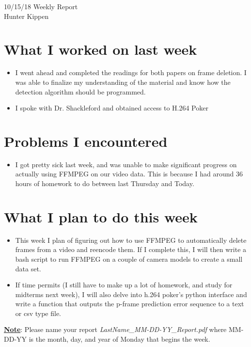 \documentclass[12pt]{article}%
\def\bi{\begin{itemize}     %
\vspace{-0.5em}\setlength\itemsep{0em}}
\begin{document}
\begin{center}
{\LARGE 10/15/18 Weekly Report}\\
\vspace{0.5em}
{\Large Hunter Kippen}
\vspace{0.5em}
\end{center}


\section{What I worked on last week}
\bi
\item I went ahead and completed the readings for both papers on frame deletion. I was able to finalize my understanding of the material and know how the detection algorithm should be programmed.
\item I spoke with Dr. Shackleford and obtained access to H.264 Poker
\end{itemize}


\section{Problems I encountered}
\bi
\item I got pretty sick last week, and was unable to make significant progress on actually using FFMPEG on our video data. This is because I had around 36 hours of homework to do between last Thursday and Today. 
\end{itemize}

\section{What I plan to do this week}
\bi
\item This week I plan of figuring out how to use FFMPEG to automatically delete frames from a video and reencode them. If I complete this, I will then write a bash script to run FFMPEG on a couple of camera models to create a small data set.
\item If time permits (I still have to make up a lot of homework, and study for midterms next week), I will also delve into h.264 poker's python interface and write a function that outputs the p-frame prediction error sequence to a text or csv type file.
\end{itemize}


\noindent
\underline{\textbf{Note}}: Please name your report \textit{LastName{\_}MM-DD-YY{\_}Report.pdf} where MM-DD-YY is the month, day, and year of Monday that begins the week.





\begin{comment}
\pagebreak
%


%
\end{comment}
\end{document}
